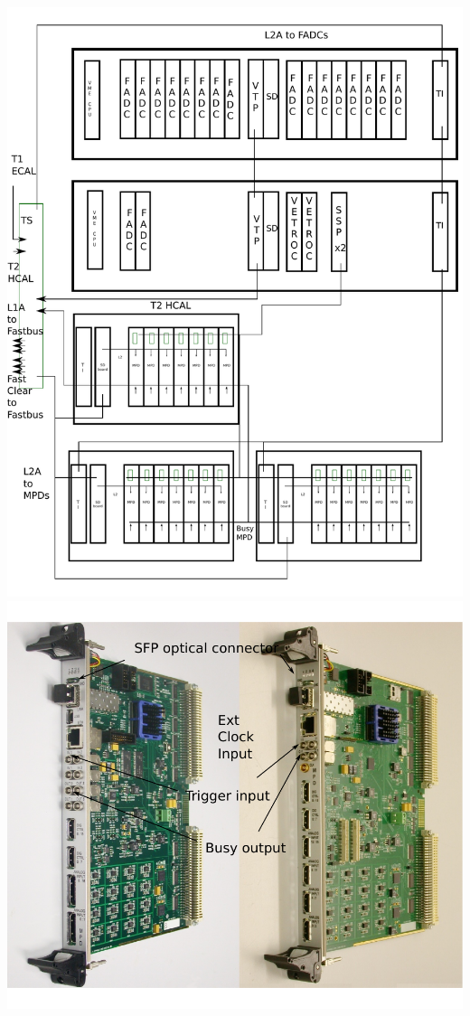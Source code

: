 \documentclass{article}
\begin{document}
\includegraphics[scale=0.55]{figs/NewMPDDetailed.pdf}\\

\includegraphics[scale=0.55]{figs/MPD4_UserManual.pdf}\\
\end{document}
